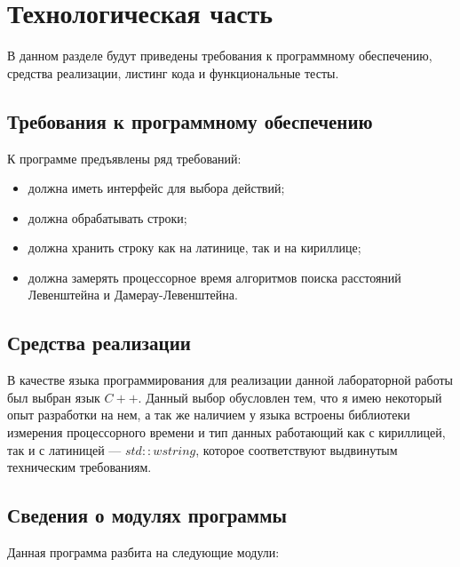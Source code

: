 \chapter{Технологическая часть}

В данном разделе будут приведены требования к программному обеспечению, средства реализации, листинг кода и функциональные тесты.

\section{Требования к программному обеспечению}

К программе предъявлены ряд требований:

\begin{itemize}
	\item должна иметь интерфейс для выбора действий;
	\item должна обрабатывать строки;
	\item должна хранить строку как на латинице, так и на кириллице;
	\item должна замерять процессорное время алгоритмов поиска расстояний Левенштейна и Дамерау-Левенштейна.
\end{itemize}

\section{Средства реализации}

В качестве языка программирования для реализации данной лабораторной работы был выбран язык $C++$. Данный выбор обусловлен тем,
что я имею некоторый опыт разработки на нем, а так же наличием у языка
встроены библиотеки измерения процессорного времени и тип данных работающий как с кириллицей, так и с латиницей --- $std::wstring$, которое соответствуют выдвинутым техническим требованиям.

\section{Сведения о модулях программы}

Данная программа разбита на следующие модули:

